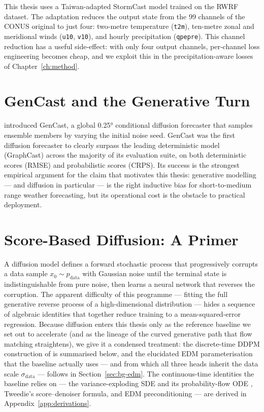 This thesis uses a Taiwan-adapted StormCast model trained on the RWRF dataset. The adaptation reduces the output state from the 99 channels of the CONUS original to just four: two-metre temperature (\texttt{t2m}), ten-metre zonal and meridional winds (\texttt{u10}, \texttt{v10}), and hourly precipitation (\texttt{qpepre}). This channel reduction has a useful side-effect: with only four output channels, per-channel loss engineering becomes cheap, and we exploit this in the precipitation-aware losses of Chapter~\ref{ch:method}.

\section{GenCast and the Generative Turn}
\label{sec:bg-gencast}

\citet{price2024gencast} introduced GenCast, a global \ang{0.25} conditional diffusion forecaster that samples ensemble members by varying the initial noise seed. GenCast was the first diffusion forecaster to clearly surpass the leading deterministic model (GraphCast) across the majority of its evaluation suite, on both deterministic scores (RMSE) and probabilistic scores (CRPS). Its success is the strongest empirical argument for the claim that motivates this thesis: generative modelling --- and diffusion in particular --- is the right inductive bias for short-to-medium range weather forecasting, but its operational cost is the obstacle to practical deployment.

\section{Score-Based Diffusion: A Primer}
\label{sec:bg-diffusion-primer}

A diffusion model defines a forward stochastic process that progressively corrupts a data sample $x_0 \sim p_{\text{data}}$ with Gaussian noise until the terminal state is indistinguishable from pure noise, then learns a neural network that reverses the corruption. The apparent difficulty of this programme --- fitting the full generative reverse process of a high-dimensional distribution --- hides a sequence of algebraic identities that together reduce training to a mean-squared-error regression. Because diffusion enters this thesis only as the reference baseline we set out to accelerate (and as the lineage of the curved generative path that flow matching straightens), we give it a condensed treatment: the discrete-time DDPM construction of \citet{ho2020ddpm} is summarised below, and the elucidated EDM parameterisation \citep{karras2022elucidating} that the baseline actually uses --- and from which all three heads inherit the data scale $\sigma_{\text{data}}$ --- follows in Section~\ref{sec:bg-edm}. The continuous-time identities the baseline relies on --- the variance-exploding SDE and its probability-flow ODE \citep{song2021scoresde}, Tweedie's score--denoiser formula, and EDM preconditioning --- are derived in Appendix~\ref{app:derivations}.

